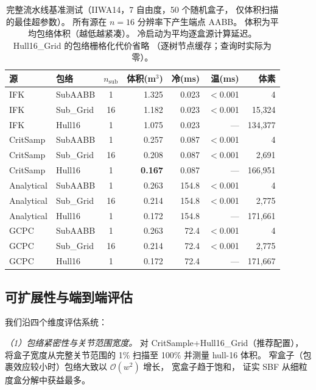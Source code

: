 \documentclass[journal]{IEEEtran}
\newcommand{\calO}{\mathcal{O}}
\begin{document}
\begin{table}[t]
\centering
\caption{完整流水线基准测试（IIWA14，7 自由度，50 个随机盒子，
仅体积扫描的最佳超参数）。
所有源在 $n{=}16$ 分辨率下产生端点 AABB。
体积为平均包络体积（越低越紧凑）。
冷启动为平均逐盒源计算延迟。
Hull16\_Grid 的包络栅格化代价省略
（逐树节点缓存；查询时实际为零）。}
\label{tab:pipeline}
\setlength{\tabcolsep}{2.5pt}
\small
\begin{tabular}{@{}llcrrrr@{}}
\toprule
源 & 包络 & $n_\text{sub}$
  & \!\!体积(m$^3$)\!\! & \!冷(ms)\! & \!温(ms)\! & 体素 \\
\midrule
IFK          & SubAABB     &  1 & 1.325 &   0.023 & $<$0.001 & 4 \\
IFK          & Sub\_Grid   & 16 & 1.182 &   0.023 &  $<$0.001 & 15{,}324 \\
IFK          & Hull16      &  1 & 1.075 &   0.023 &  --- & 134{,}377 \\
\midrule
CritSamp     & SubAABB     &  1 & 0.257 &   0.087 & $<$0.001 & 4 \\
CritSamp     & Sub\_Grid   & 16 & 0.208 &   0.087 &  $<$0.001 & 2{,}691 \\
CritSamp     & Hull16      &  1 & \textbf{0.167} &   0.087 &  --- & 166{,}951 \\
\midrule
Analytical   & SubAABB     &  1 & 0.263 & 154.8\phantom{0}   & $<$0.001 & 4 \\
Analytical   & Sub\_Grid   & 16 & 0.214 & 154.8\phantom{0}   &  $<$0.001 & 2{,}775 \\
Analytical   & Hull16      &  1 & 0.172 & 154.8\phantom{0}   &  --- & 171{,}661 \\
\midrule
GCPC         & SubAABB     &  1 & 0.263 &  72.4\phantom{0}   & $<$0.001 & 4 \\
GCPC         & Sub\_Grid   & 16 & 0.214 &  72.4\phantom{0}   &  $<$0.001 & 2{,}775 \\
GCPC         & Hull16      &  1 & 0.172 &  72.4\phantom{0}   &  --- & 171{,}667 \\
\bottomrule
\end{tabular}
\end{table}

\subsection{可扩展性与端到端评估}\label{sec:exp_scalability}

我们沿四个维度评估系统：

\emph{（1）包络紧密性与关节范围宽度。}
对 CritSample+Hull16\_Grid（推荐配置），
将盒子宽度从完整关节范围的 1\% 扫描至 100\%
并测量 hull-16 体积。
窄盒子（包裹效应较小时）包络大致以 $\calO(w^2)$ 增长，
宽盒子趋于饱和，
证实 SBF 从细粒度盒分解中获益最多。
\end{document}
